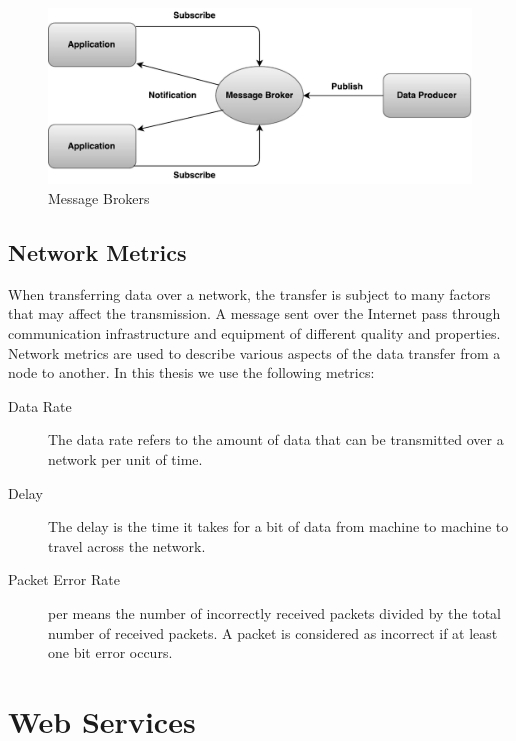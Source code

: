 \begin{figure}[h]
\centering
\includegraphics[scale=0.6]{images/pubsub.pdf}
\caption{Message Brokers}
\label{figure-message-brokers}
\end{figure}


\subsection{Network Metrics}
\label{section:network-mectrics}

When transferring data over a network, the transfer is subject to many factors
that may affect the transmission. A message sent over the Internet pass through
communication infrastructure and equipment of different quality and properties.
Network metrics are used to describe various aspects of the data transfer from a
node to another. In this thesis we use the following metrics:

\begin{description}

\item[Data Rate] The data rate refers to the amount of data that can be
transmitted over a network per unit of time.

\item[Delay] The delay is the time it takes for a bit of data from machine to
machine to travel across the network.

\item[Packet Error Rate] \gls{per} means the number of incorrectly received
packets divided by the total number of received packets. A packet is considered
as incorrect if at least one bit error occurs.

\end{description}


\section{Web Services}
\label{web-services}


